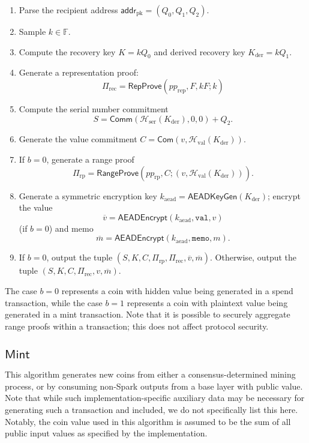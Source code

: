 \documentclass{llncs}
\newcommand{\F}{\mathbb{F}}
\newcommand{\hash}{\mathcal{H}}
\newcommand{\func}[1]{\mathsf{#1}}
\newcommand{\addr}{\func{addr}}
\newcommand{\com}{\func{Com}}
\newcommand{\comm}{\func{Comm}}
\begin{document}
\begin{enumerate}
\item Parse the recipient address $\addr_{\text{pk}} = (Q_0, Q_1, Q_2)$.
\item Sample $k \in \F$.
\item Compute the recovery key $K = kQ_0$ and derived recovery key $K_{\text{der}} = kQ_1$.
\item Generate a representation proof: $$\Pi_{\text{rec}} = \func{RepProve}(pp_{\text{rep}},F,kF ; k)$$
\item Compute the serial number commitment $$S = \comm(\hash_{\text{ser}}(K_{\text{der}}), 0, 0) + Q_2.$$
\item Generate the value commitment $C = \com(v, \hash_{\text{val}}(K_{\text{der}}))$.
\item If $b=0$, generate a range proof $$\Pi_{\text{rp}} = \func{RangeProve}(pp_{\text{rp}},C;(v,\hash_{\text{val}}(K_{\text{der}}))).$$
\item Generate a symmetric encryption key $k_{\text{aead}} = \func{AEADKeyGen}(K_{\text{der}})$; encrypt the value $$\overline{v} = \func{AEADEncrypt}(k_{\text{aead}},\texttt{val},v)$$ (if $b=0$) and memo $$\overline{m} = \func{AEADEncrypt}(k_{\text{aead}},\texttt{memo},m).$$
\item If $b=0$, output the tuple $(S, K, C, \Pi_{\text{rp}}, \Pi_{\text{rec}}, \overline{v}, \overline{m})$.
Otherwise, output the tuple $(S, K, C, \Pi_{\text{rec}}, v, \overline{m})$.
\end{enumerate}
The case $b=0$ represents a coin with hidden value being generated in a spend transaction, while the case $b=1$ represents a coin with plaintext value being generated in a mint transaction.
Note that it is possible to securely aggregate range proofs within a transaction; this does not affect protocol security.


\subsection{\texorpdfstring{$\func{Mint}$}{Mint}}

This algorithm generates new coins from either a consensus-determined mining process, or by consuming non-Spark outputs from a base layer with public value.
Note that while such implementation-specific auxiliary data may be necessary for generating such a transaction and included, we do not specifically list this here.
Notably, the coin value used in this algorithm is assumed to be the sum of all public input values as specified by the implementation.
\end{document}
